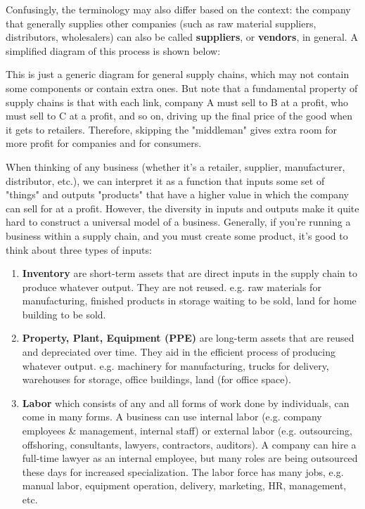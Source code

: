 \documentclass{article}
\begin{document}
    Confusingly, the terminology may also differ based on the context: the company that generally supplies other companies (such as raw material suppliers, distributors, wholesalers) can also be called \textbf{suppliers}, or \textbf{vendors}, in general. A simplified diagram of this process is shown below:
    \begin{center}
    \end{center}
    This is just a generic diagram for general supply chains, which may not contain some components or contain extra ones. But note that a fundamental property of supply chains is that with each link, company A must sell to B at a profit, who must sell to C at a profit, and so on, driving up the final price of the good when it gets to retailers. Therefore, skipping the "middleman" gives extra room for more profit for companies and for consumers.

    When thinking of any business (whether it's a retailer, supplier, manufacturer, distributor, etc.), we can interpret it as a function that inputs some set of "things" and outputs "products" that have a higher value in which the company can sell for at a profit. However, the diversity in inputs and outputs make it quite hard to construct a universal model of a business. Generally, if you're running a business within a supply chain, and you must create some product, it's good to think about three types of inputs:

    \begin{enumerate}
      \item \textbf{Inventory} are short-term assets that are direct inputs in the supply chain to produce whatever output. They are not reused. e.g. raw materials for manufacturing, finished products in storage waiting to be sold, land for home building to be sold.
      \item \textbf{Property, Plant, Equipment (PPE)} are long-term assets that are reused and depreciated over time. They aid in the efficient process of producing whatever output. e.g. machinery for manufacturing, trucks for delivery, warehouses for storage, office buildings, land (for office space).
      \item \textbf{Labor} which consists of any and all forms of work done by individuals, can come in many forms. A business can use internal labor (e.g. company employees \& management, internal staff) or external labor (e.g. outsourcing, offshoring, consultants, lawyers, contractors, auditors). A company can hire a full-time lawyer as an internal employee, but many roles are being outsourced these days for increased specialization. The labor force has many jobs, e.g. manual labor, equipment operation, delivery, marketing, HR, management, etc.
    \end{enumerate}
\end{document}
